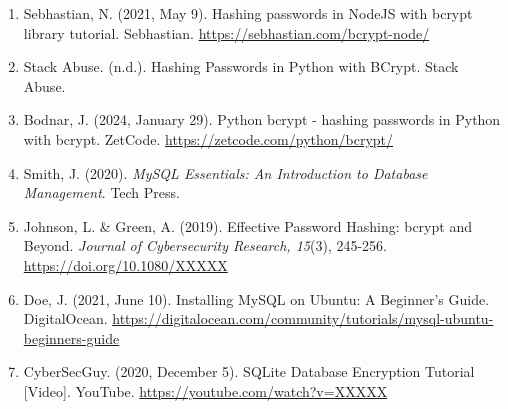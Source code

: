 \documentclass{article}
\begin{document}
\begin{enumerate}
  \item Sebhastian, N. (2021, May 9). Hashing passwords in NodeJS with bcrypt library tutorial. Sebhastian. \url{https://sebhastian.com/bcrypt-node/}

  \item Stack Abuse. (n.d.). Hashing Passwords in Python with BCrypt. Stack Abuse.

  \item Bodnar, J. (2024, January 29). Python bcrypt - hashing passwords in Python with bcrypt. ZetCode. \url{https://zetcode.com/python/bcrypt/}

  \item Smith, J. (2020). \textit{MySQL Essentials: An Introduction to Database Management}. Tech Press.

  \item Johnson, L. \& Green, A. (2019). Effective Password Hashing: bcrypt and Beyond. \textit{Journal of Cybersecurity Research, 15}(3), 245-256. \url{https://doi.org/10.1080/XXXXX}

  \item Doe, J. (2021, June 10). Installing MySQL on Ubuntu: A Beginner's Guide. DigitalOcean. \url{https://digitalocean.com/community/tutorials/mysql-ubuntu-beginners-guide}

  \item CyberSecGuy. (2020, December 5). SQLite Database Encryption Tutorial [Video]. YouTube. \url{https://youtube.com/watch?v=XXXXX}
\end{enumerate}
\end{document}
